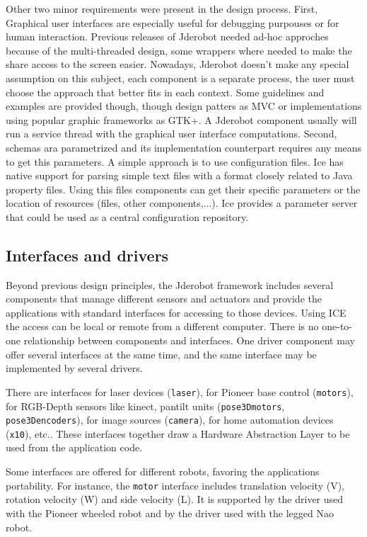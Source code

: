 \documentclass[twocolumn]{svjour3}          %
\begin{document}
Other two minor requirements were present in the design process. First, Graphical user interfaces are especially useful for debugging purpouses or for human interaction. Previous releases of Jderobot needed ad-hoc approches because of the multi-threaded design, some wrappers where needed to make the share access to the screen easier. Nowadays, Jderobot doesn't make any special assumption on this subject, each component is a separate process, the user must choose the approach that better fits in each context. Some guidelines and examples are provided though, though design patters as MVC or implementations using popular graphic frameworks as GTK+. A Jderobot component usually will run a service thread with the graphical user interface computations. Second, schemas ara parametrized and its implementation counterpart requires any means to get this parameters. A simple approach is to use configuration files. Ice has native support for parsing simple text files with a format closely related to Java property files. Using this files components can get their specific parameters or the location of resources (files, other components,...). Ice provides a parameter server that could be used as a central configuration repository.

\subsection{Interfaces and drivers}
\label{sec:drivers}

Beyond previous design principles, the Jderobot framework includes several components that manage different sensors and actuators and provide the applications with standard interfaces for accessing to those devices. Using ICE the access can be local or remote from a different computer. There is no one-to-one relationship between components and interfaces. One driver component may offer several interfaces at the same time, and the same interface may be implemented by several drivers.

There are interfaces for laser devices (\texttt{laser}), for Pioneer base control (\texttt{motors}), for RGB-Depth sensors like kinect, pantilt units (\texttt{pose3Dmotors}, \texttt{pose3Dencoders}), for image sources (\texttt{camera}), for home automation devices (\texttt{x10}), etc.. These interfaces together draw a Hardware Abstraction Layer to be used from the application code. 

Some interfaces are offered for different robots, favoring the applications portability. For instance, the \texttt{motor} interface includes translation velocity (V), rotation velocity (W) and side velocity (L). It is supported by the driver used with the Pioneer wheeled robot and by the driver used with the legged Nao robot.
\end{document}
